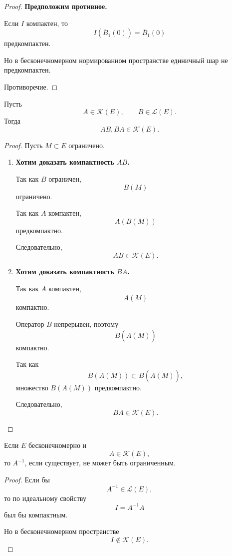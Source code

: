 \begin{proof}
	\textbf{Предположим противное.}
	
	Если \(I\) компактен, то
	\[
	I(\overline B_1(0))
	=
	\overline B_1(0)
	\]
	предкомпактен.
	
	Но в бесконечномерном нормированном пространстве единичный шар
	не предкомпактен.
	
	Противоречие.
\end{proof}

\begin{theorem}
	Пусть
	\[
	A\in\mathcal K(E),
	\qquad
	B\in\mathcal L(E).
	\]
	Тогда
	\[
	AB,BA\in\mathcal K(E).
	\]
\end{theorem}

\begin{proof}
	Пусть \(M\subset E\) ограничено.
	
	\begin{enumerate}
		\item
		\textbf{Хотим доказать компактность \(AB\).}
		
		Так как \(B\) ограничен,
		\[
		B(M)
		\]
		ограничено.
		
		Так как \(A\) компактен,
		\[
		A(B(M))
		\]
		предкомпактно.
		
		Следовательно,
		\[
		AB\in\mathcal K(E).
		\]
		
		\item
		\textbf{Хотим доказать компактность \(BA\).}
		
		Так как \(A\) компактен,
		\[
		\overline{A(M)}
		\]
		компактно.
		
		Оператор \(B\) непрерывен, поэтому
		\[
		B(\overline{A(M)})
		\]
		компактно.
		
		Так как
		\[
		B(A(M))
		\subset
		B(\overline{A(M)}),
		\]
		множество \(B(A(M))\) предкомпактно.
		
		Следовательно,
		\[
		BA\in\mathcal K(E).
		\]
	\end{enumerate}
\end{proof}

\begin{corollary}
	Если \(E\) бесконечномерно и
	\[
	A\in\mathcal K(E),
	\]
	то \(A^{-1}\), если существует, не может быть ограниченным.
\end{corollary}

\begin{proof}
	Если бы
	\[
	A^{-1}\in\mathcal L(E),
	\]
	то по идеальному свойству
	\[
	I=A^{-1}A
	\]
	был бы компактным.
	
	Но в бесконечномерном пространстве
	\[
	I\notin\mathcal K(E).
	\]
\end{proof}

